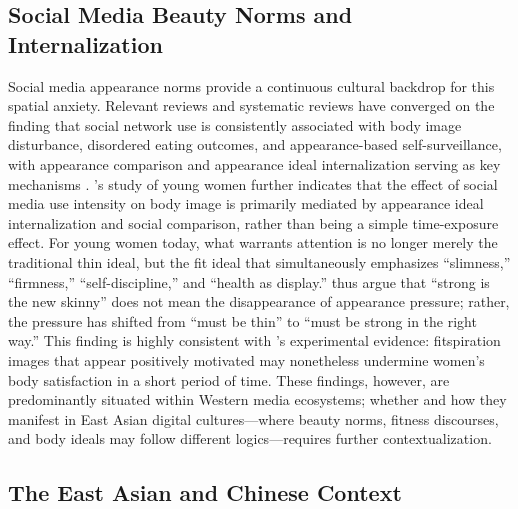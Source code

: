 \subsection{Social Media Beauty Norms and Internalization}

Social media appearance norms provide a continuous cultural backdrop for this spatial anxiety.
Relevant reviews and systematic reviews have converged on the finding that social network use is consistently associated with body image disturbance, disordered eating outcomes, and appearance-based self-surveillance, with appearance comparison and appearance ideal internalization serving as key mechanisms \parencite{holland2016systematic}.
\textcite{jung2022social}'s study of young women further indicates that the effect of social media use intensity on body image is primarily mediated by appearance ideal internalization and social comparison, rather than being a simple time-exposure effect.
For young women today, what warrants attention is no longer merely the traditional thin ideal, but the fit ideal that simultaneously emphasizes ``slimness,'' ``firmness,'' ``self-discipline,'' and ``health as display.''
\textcite{donovan2020fitideal} thus argue that ``strong is the new skinny'' does not mean the disappearance of appearance pressure; rather, the pressure has shifted from ``must be thin'' to ``must be strong in the right way.''
This finding is highly consistent with \textcite{tiggemann2015fitspiration}'s experimental evidence:
fitspiration images that appear positively motivated may nonetheless undermine women's body satisfaction in a short period of time.
These findings, however, are predominantly situated within Western media ecosystems; whether and how they manifest in East Asian digital cultures---where beauty norms, fitness discourses, and body ideals may follow different logics---requires further contextualization.

\subsection{The East Asian and Chinese Context}

